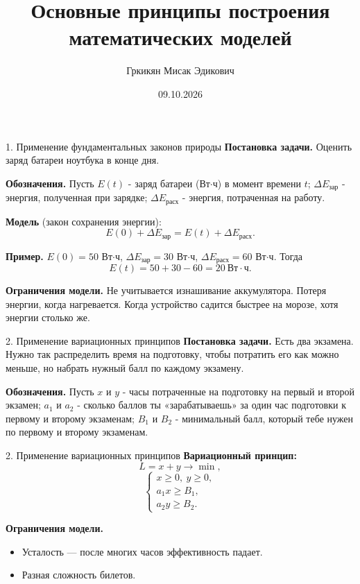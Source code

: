 \documentclass{beamer}
\title[Математическое моделирование]{Основные принципы построения математических моделей}
\author[Гркикян М.Э.]{Гркикян Мисак Эдикович}
\date{09.10.2026}
\begin{document}
	\begin{frame}
		\titlepage
	\end{frame}

    \begin{frame}{1. Применение фундаментальных законов природы}
        \textbf{Постановка задачи.} Оценить заряд батареи ноутбука в конце дня.

        \medskip
        \textbf{Обозначения.} Пусть $E(t)$ - заряд батареи (Вт$\cdot$ч) в момент времени $t$;
        $\Delta E_{\text{зар}}$ - энергия, полученная при зарядке;
        $\Delta E_{\text{расх}}$ - энергия, потраченная на работу.

        \medskip
        \textbf{Модель} (закон сохранения энергии):
        \[
            E(0) + \Delta E_{\text{зар}} = E(t) + \Delta E_{\text{расх}}.
        \]

        \medskip
        \textbf{Пример.} $E(0) = 50$ Вт$\cdot$ч,
        $\Delta E_{\text{зар}} = 30$ Вт$\cdot$ч,
        $\Delta E_{\text{расх}} = 60$ Вт$\cdot$ч. Тогда
        \[
            E(t) = 50 + 30 - 60 = 20\ \text{Вт}\cdot\text{ч}.
        \]

        \textbf{Ограничения модели.} Не учитывается изнашивание аккумулятора.
        Потеря энергии, когда нагревается. Когда устройство садится быстрее на морозе, хотя энергии столько же.
    \end{frame}

    \begin{frame}{2. Применение вариационных принципов}
        \textbf{Постановка задачи.} Есть два экзамена. Нужно так распределить время
        на подготовку, чтобы потратить его как можно меньше, но набрать
        нужный балл по каждому экзамену.

        \medskip
        \textbf{Обозначения.} Пусть $x$ и $y$ - часы потраченные на подготовку на первый и второй экзамен; 
        $a_1$ и $a_2$ - сколько баллов ты «зарабатываешь» за один час подготовки к первому и второму экзаменам;
        $B_1$ и $B_2$ - минимальный балл, который тебе нужен по первому и второму экзаменам.

    \end{frame}

    \begin{frame}{2. Применение вариационных принципов}
        \textbf{Вариационный принцип:}
        \[
            L = x + y \to \min,
        \]
        \[
            \begin{cases}
                x \ge 0,\ y \ge 0, \\
                a_1 x \ge B_1, \\
                a_2 y \ge B_2.
            \end{cases}
        \]
        
        \textbf{Ограничения модели.}
        \begin{itemize}
            \item Усталость — после многих часов эффективность падает.
            \item Разная сложность билетов.
        \end{itemize}
    \end{frame}
\end{document}
